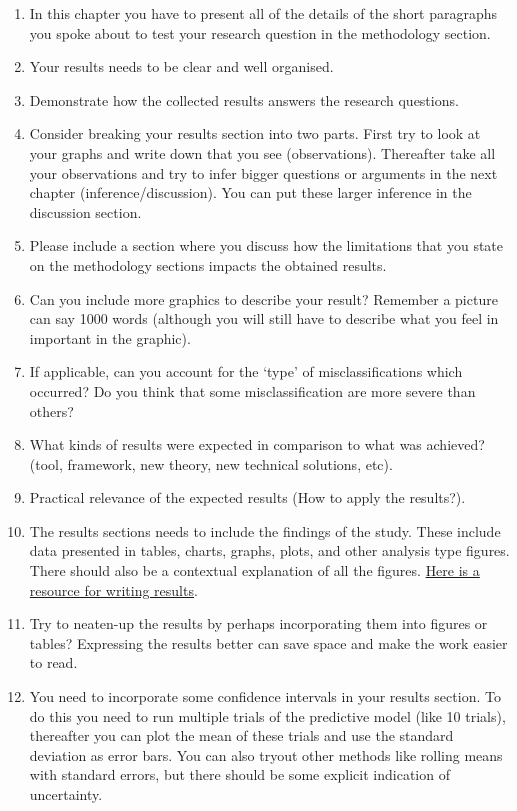 \begin{enumerate}[resume]
    \item In this chapter you have to present all of the details of the short paragraphs you spoke about to test your research question in the methodology section.   
    \item  Your results needs to be clear and well organised.
    \item  Demonstrate how the collected results answers the research questions. 
    \item  Consider breaking your results section into two parts. First try to look at your graphs and write down that you see (observations). Thereafter take all your observations and try to infer bigger questions or arguments in the next chapter (inference/discussion). You can put these larger inference in the discussion section.
    \item  Please include a section where you discuss how the limitations that you state on the methodology sections impacts the obtained results. 
    \item  Can you include more graphics to describe your result? Remember a picture can say 1000 words (although you will still have to describe what you feel in important in the graphic).
    \item  If applicable, can you account for the `type' of misclassifications which occurred? Do you think that some misclassification are more severe than others?    
    
    
    \item  What kinds of results were expected in comparison to what was achieved? (tool, framework, new theory, new technical solutions, etc).
    \item  Practical relevance of the expected results (How to apply the results?).
    \item  The results sections needs to include the findings of the study. These include data presented in tables, charts, graphs, plots, and other analysis type figures. There should also be a contextual explanation of all the figures. \href{https://blog.wordvice.com/writing-the-results-section-for-a-research-paper/#:~:text=The\%20Results\%20section\%20should\%20include,its\%20meaning\%20in\%20sentence\%20form}{Here is a resource for writing results}.
    \item Try to neaten-up the results by perhaps incorporating them into figures or tables? Expressing the results better can save space and make the work easier to read.
    \item  You need to incorporate some confidence intervals in your results section. To do this you need to run multiple trials of the predictive model (like 10 trials), thereafter you can plot the mean of these trials and use the standard deviation as error bars. You can also tryout other methods like rolling means with standard errors, but there should be some explicit indication of uncertainty.
\end{enumerate}